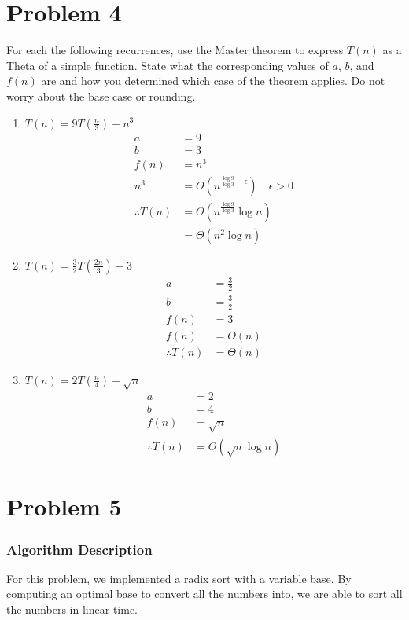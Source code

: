 \documentclass{math}
\begin{document}
\section*{Problem 4}
For each the following recurrences, use the Master theorem to express \( T(n) \)
as a Theta of a simple function. State what the corresponding values of \( a \),
\( b \), and \( f(n) \) are and how you determined which case of the theorem
applies. Do not worry about the base case or rounding.
\begin{enumerate}
  \item \( T(n) = 9T(\frac{n}{3})+n^3 \)
  \begin{align*}
    a &= 9 \\
    b &= 3 \\
    f(n) &= n^3 \\
    n^3 &= O(n^{\frac{\log9}{\log3}-\epsilon})\quad \epsilon > 0 \\
    \therefore T(n) &= \Theta(n^{\frac{\log9}{\log3}}\log n) \\
    &= \Theta(n^2\log n)
  \end{align*}
  \item \( T(n) = \frac{3}{2}T(\frac{2n}{3})+3 \)
  \begin{align*}
    a &= \frac{3}{2} \\
    b &= \frac{3}{2} \\
    f(n) &= 3 \\
    f(n) &= O(n) \\
    \therefore T(n) &= \Theta(n)
  \end{align*}
  \item \( T(n) = 2T(\frac{n}{4}) + \sqrt{n} \)
  \begin{align*}
    a &= 2 \\
    b &= 4 \\
    f(n) &= \sqrt{n} \\
    \therefore T(n) &= \Theta(\sqrt{n}\log n)
  \end{align*}
\end{enumerate}

\section*{Problem 5}

\subsubsection*{Algorithm Description}
For this problem, we implemented a radix sort with a variable base. By computing
an optimal base to convert all the numbers into, we are able to sort all the
numbers in linear time.
\end{document}
